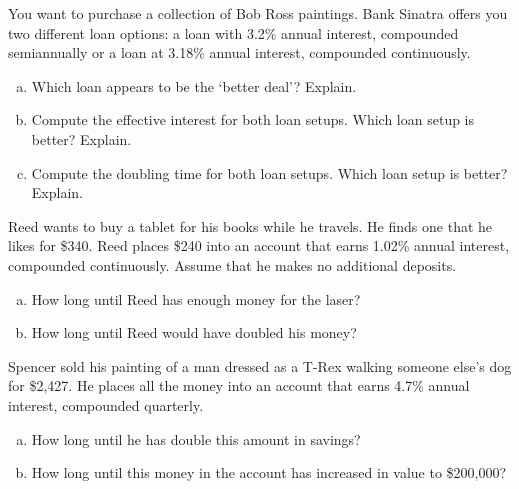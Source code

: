 \documentclass[11pt,letterpaper]{article}
\begin{document}

 You want to purchase a collection of Bob Ross paintings. Bank Sinatra offers you two different loan options: a loan with 3.2\% annual interest, compounded semiannually or a loan at 3.18\% annual interest, compounded continuously. 
	\begin{enumerate}[(a)]
	\item Which loan appears to be the `better deal'? Explain. 
	\item Compute the effective interest for both loan setups. Which loan setup is better? Explain. 
	\item Compute the doubling time for both loan setups. Which loan setup is better? Explain.
	\end{enumerate}



\newpage



 Reed wants to buy a tablet for his books while he travels. He finds one that he likes for \$340. Reed places \$240 into an account that earns 1.02\% annual interest, compounded continuously. Assume that he makes no additional deposits. 
	\begin{enumerate}[(a)]
	\item How long until Reed has enough money for the laser?
	\item How long until Reed would have doubled his money?
	\end{enumerate}



\newpage



 Spencer sold his painting of a man dressed as a T-Rex walking someone else's dog for \$2,427. He places all the money into an account that earns 4.7\% annual interest, compounded quarterly. 
	\begin{enumerate}[(a)]
	\item How long until he has double this amount in savings?
	\item How long until this money in the account has increased in value to \$200,000?
	\end{enumerate}
\end{document}

